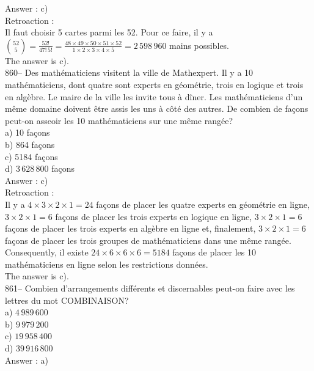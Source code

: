 ﻿\documentclass[letterpaper, 12pt]{article}
\begin{document}
Answer : c)\\

Retroaction : \\
Il faut choisir 5 cartes parmi les 52.  Pour ce faire, il y a
$\binom{52}{5}=\frac{52!}{47!\,5!}=\frac{48\times49\times50\times51\times52}{1\times2\times3\times4\times5}=2\,598\,960$
mains possibles.\\
The answer is c).\\

860--  Des math\'ematiciens visitent la ville de Mathexpert.  Il y a 10
math\'ematiciens, dont quatre sont experts en g\'eom\'etrie, trois en
logique et trois en alg\`ebre.  Le maire de la ville les invite tous \`a
d\^iner.  Les math\'ematiciens d'un m\^eme domaine doivent \^etre assis les
uns \`a c\^ot\'e des autres.  De combien de fa\c cons peut-on asseoir les 10
math\'ematiciens sur une m\^eme rang\'ee?\\
a) 10  fa\c cons\\
b) 864  fa\c cons\\
c) 5184  fa\c cons\\
d) $3\,628\,800$  fa\c cons\\

Answer : c)\\

Retroaction : \\
Il y a $4\times3\times2\times1=24$ fa\c cons de placer les quatre
experts en g\'eom\'etrie en ligne, $3\times2\times1=6$ fa\c cons de
placer les trois experts en logique en ligne, $3\times2\times1=6$
fa\c cons
de placer les trois experts en alg\`ebre en ligne et, finalement,
$3\times2\times1=6$ fa\c cons de placer les trois groupes de
math\'ematiciens dans une m\^eme rang\'ee.  \\
Consequently, il existe $24\times6\times6\times6=5184$ fa\c cons de
placer les 10 math\'ematiciens en ligne selon les restrictions donn\'ees.
\\
The answer is c).\\

861-- Combien d'arrangements diff\'erents et discernables peut-on faire avec
les lettres du mot \sloppy \mbox{COMBINAISON?}\\
a) $4\,989\,600$\\
b) $9\,979\,200$\\
c) $19\,958\,400$\\
d) $39\,916\,800$\\

Answer : a)\\
\end{document}
